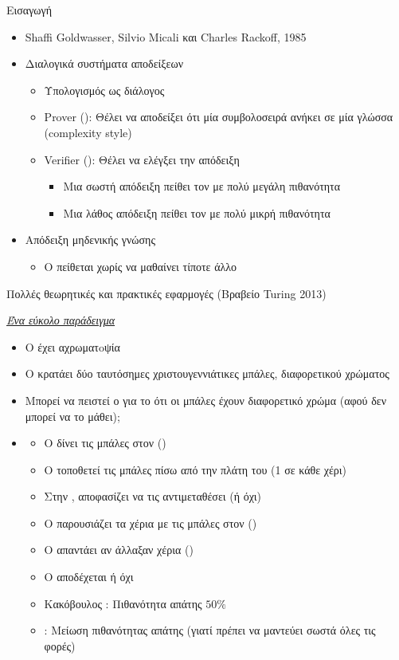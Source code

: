 \documentclass[handout]{beamer}
\begin{document}
\begin{frame}{Εισαγωγή}
\begin{itemize}
\item Shaffi Goldwasser, Silvio Micali και Charles Rackoff, 1985
\pause
\item Διαλογικά συστήματα αποδείξεων
\pause
\begin{itemize}
\item Υπολογισμός ως διάλογος
\pause
\item Prover (\prv): Θέλει να αποδείξει ότι μία συμβολοσειρά ανήκει σε μία γλώσσα (complexity style)
\pause
\item Verifier (\ver): Θέλει να ελέγξει την απόδειξη
\pause
\begin{itemize}
\item Μια σωστή απόδειξη πείθει τον \ver με πολύ μεγάλη πιθανότητα
\item Μια λάθος απόδειξη πείθει τον \ver με πολύ μικρή πιθανότητα
\end{itemize}
\end{itemize}
\item Απόδειξη μηδενικής γνώσης
\begin{itemize}
\item Ο \ver πείθεται χωρίς να μαθαίνει τίποτε άλλο 
\end{itemize}
\pause
\end{itemize}
Πολλές θεωρητικές και πρακτικές εφαρμογές (Βραβείο Turing 2013)
\end{frame}

\begin{frame}{\textit{\href{http://mathoverflow.net/questions/22624/example-of-a-good-zero-knowledge-proof}{Ένα εύκολο παράδειγμα}}}
\begin{itemize}
\item Ο \ver έχει αχρωματoψία
\pause
\item O \prv κρατάει δύο ταυτόσημες χριστουγεννιάτικες μπάλες, διαφορετικού χρώματος
\pause
\item Μπορεί να πειστεί ο \ver για το ότι οι μπάλες έχουν διαφορετικό χρώμα (\alert{αφού δεν μπορεί να το μάθει});
\pause
\item {}
\begin{itemize}
\item Ο \prv δίνει τις μπάλες στον \ver ()
\item Ο \ver τοποθετεί τις μπάλες πίσω από την πλάτη του (1 σε κάθε χέρι)
\pause
\item Στην , αποφασίζει να τις αντιμεταθέσει (ή όχι)
\pause
\item O \ver παρουσιάζει τα χέρια με τις μπάλες στον \prv ()
\pause
\item Ο \prv απαντάει αν άλλαξαν χέρια ()
\pause
\item Ο \ver αποδέχεται ή όχι
\pause
\item Κακόβουλος \prv: Πιθανότητα απάτης $50\%$
\pause
\item {}: Μείωση πιθανότητας απάτης (γιατί πρέπει να μαντεύει σωστά όλες τις φορές)
\end{itemize}
\end{itemize}
\end{frame}
\end{document}
